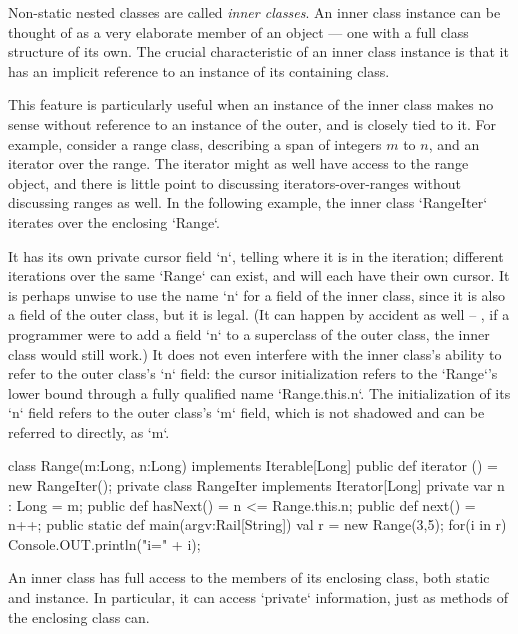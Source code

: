 Non-static nested classes are called {\em inner classes}. An inner class
instance can be thought of as a very elaborate member of an object --- one
with a full class structure of its own.   The crucial characteristic of an
inner class instance is that it has an implicit reference to an instance of
its containing class.  

\begin{ex}
This feature is particularly useful when an instance of the inner class makes
no sense without reference to an instance of the outer, and is closely tied to
it.  For example, consider a range class, describing a span of integers {$m$}
to {$n$}, and an iterator over the range.  The iterator might as well have
access to the range object, and there is little point to discussing
iterators-over-ranges without discussing ranges as well.
In the following example, the inner class \xcd`RangeIter` iterates over the
enclosing \xcd`Range`.  

It has its own private cursor field \xcd`n`, telling
where it is in the iteration; different iterations over the same \xcd`Range`
can exist, and will each have their own cursor.
It is perhaps unwise to use the name \xcd`n` for a field of the inner class,
since it is also a field of the outer class, but it is legal.  (It can happen
by accident as well -- \eg, if a programmer were to add a field \xcd`n` to a
superclass of the  outer class, the inner class would still work.)
It does not even
interfere with the inner class's ability to refer to the outer class's \xcd`n`
field: the cursor initialization 
refers to the \xcd`Range`'s lower bound through a fully qualified name
\xcd`Range.this.n`.
The initialization of its \xcd`n` field refers to the outer class's \xcd`m` field, which is
not shadowed and can be referred to directly, as \xcd`m`.


\begin{xten}
class Range(m:Long, n:Long) implements Iterable[Long]{
  public def iterator ()  = new RangeIter();
  private class RangeIter implements Iterator[Long] {
     private var n : Long = m;
     public def hasNext() = n <= Range.this.n;
     public def next() = n++;
  }
  public static def main(argv:Rail[String]) {
    val r = new Range(3,5);
    for(i in r) Console.OUT.println("i=" + i);
  }
}
\end{xten}
%
\end{ex}

An inner class has full access to the members of its enclosing class, both
static and instance.  In particular, it can access \xcd`private` information,
just as methods of the enclosing class can.  

